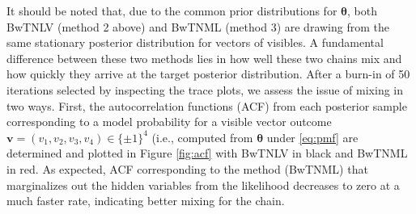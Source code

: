 \documentclass[]{article}
\theoremstyle{definition}
\begin{document}
It should be noted that, due to the common prior distributions for
\(\boldsymbol \theta\), both BwTNLV (method 2 above) and BwTNML (method
3) are drawing from the same stationary posterior distribution for
vectors of visibles. A fundamental difference between these two methods
lies in how well these two chains mix and how quickly they arrive at the
target posterior distribution. After a burn-in of 50 iterations selected
by inspecting the trace plots, we assess the issue of mixing in two
ways. First, the autocorrelation functions (ACF) from each posterior
sample corresponding to a model probability for a visible vector outcome
\(\mathbf{v}=(v_1,v_2,v_3,v_4)\in\{\pm 1\}^4\) (i.e., computed from
\(\boldsymbol \theta\) under \eqref{eq:pmf} are determined and plotted in
Figure \ref{fig:acf} with BwTNLV in black and BwTNML in red. As
expected, ACF corresponding to the method (BwTNML) that marginalizes out
the hidden variables from the likelihood decreases to zero at a much
faster rate, indicating better mixing for the chain.
\end{document}
